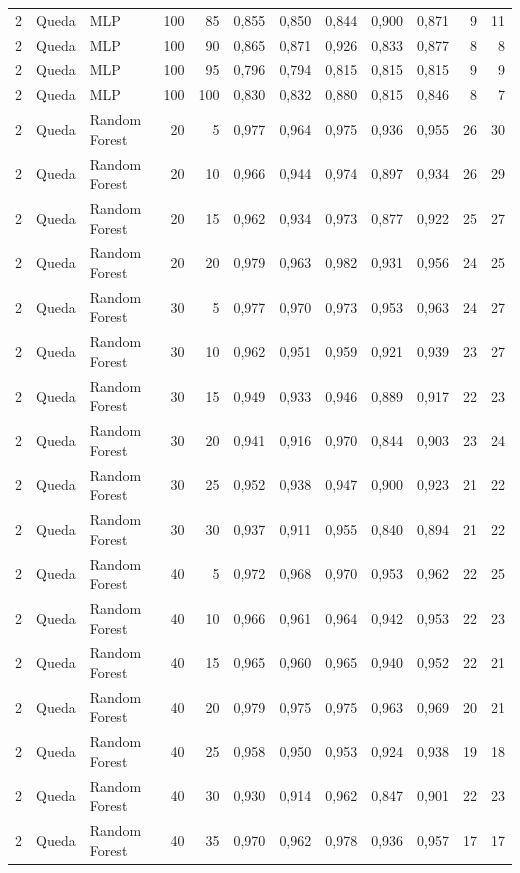 \begin{longtable}{@{}rllrrrrrrrrr@{}}
2 & Queda & MLP & 100 & 85 & 0,855 & 0,850 & 0,844 & 0,900 & 0,871 & 9 & 11 \\
2 & Queda & MLP & 100 & 90 & 0,865 & 0,871 & 0,926 & 0,833 & 0,877 & 8 & 8 \\
2 & Queda & MLP & 100 & 95 & 0,796 & 0,794 & 0,815 & 0,815 & 0,815 & 9 & 9 \\
2 & Queda & MLP & 100 & 100 & 0,830 & 0,832 & 0,880 & 0,815 & 0,846 & 8 & 7 \\
2 & Queda & Random Forest & 20 & 5 & 0,977 & 0,964 & 0,975 & 0,936 & 0,955 & 26 & 30 \\
2 & Queda & Random Forest & 20 & 10 & 0,966 & 0,944 & 0,974 & 0,897 & 0,934 & 26 & 29 \\
2 & Queda & Random Forest & 20 & 15 & 0,962 & 0,934 & 0,973 & 0,877 & 0,922 & 25 & 27 \\
2 & Queda & Random Forest & 20 & 20 & 0,979 & 0,963 & 0,982 & 0,931 & 0,956 & 24 & 25 \\
2 & Queda & Random Forest & 30 & 5 & 0,977 & 0,970 & 0,973 & 0,953 & 0,963 & 24 & 27 \\
2 & Queda & Random Forest & 30 & 10 & 0,962 & 0,951 & 0,959 & 0,921 & 0,939 & 23 & 27 \\
2 & Queda & Random Forest & 30 & 15 & 0,949 & 0,933 & 0,946 & 0,889 & 0,917 & 22 & 23 \\
2 & Queda & Random Forest & 30 & 20 & 0,941 & 0,916 & 0,970 & 0,844 & 0,903 & 23 & 24 \\
2 & Queda & Random Forest & 30 & 25 & 0,952 & 0,938 & 0,947 & 0,900 & 0,923 & 21 & 22 \\
2 & Queda & Random Forest & 30 & 30 & 0,937 & 0,911 & 0,955 & 0,840 & 0,894 & 21 & 22 \\
2 & Queda & Random Forest & 40 & 5 & 0,972 & 0,968 & 0,970 & 0,953 & 0,962 & 22 & 25 \\
2 & Queda & Random Forest & 40 & 10 & 0,966 & 0,961 & 0,964 & 0,942 & 0,953 & 22 & 23 \\
2 & Queda & Random Forest & 40 & 15 & 0,965 & 0,960 & 0,965 & 0,940 & 0,952 & 22 & 21 \\
2 & Queda & Random Forest & 40 & 20 & 0,979 & 0,975 & 0,975 & 0,963 & 0,969 & 20 & 21 \\
2 & Queda & Random Forest & 40 & 25 & 0,958 & 0,950 & 0,953 & 0,924 & 0,938 & 19 & 18 \\
2 & Queda & Random Forest & 40 & 30 & 0,930 & 0,914 & 0,962 & 0,847 & 0,901 & 22 & 23 \\
2 & Queda & Random Forest & 40 & 35 & 0,970 & 0,962 & 0,978 & 0,936 & 0,957 & 17 & 17 \\

\end{longtable}
